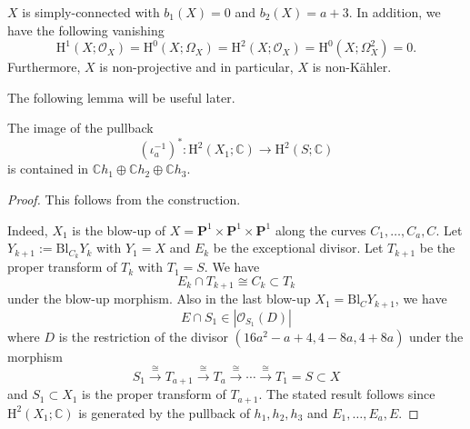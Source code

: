 \begin{proposition}
\(X\) is simply-connected with \(b_{1}(X)=0\) and \(b_{2}(X)=a+3\). In addition, we have
the following vanishing
\begin{equation}
\mathrm{H}^{1}(X;\mathcal{O}_{X})=\mathrm{H}^{0}(X;\Omega_{X})
=\mathrm{H}^{2}(X;\mathcal{O}_{X})
=\mathrm{H}^{0}(X;\Omega_{X}^{2})=0.
\end{equation}
Furthermore, \(X\) is non-projective and in particular, \(X\) is non-K\"{a}hler.
\end{proposition}

The following lemma will be useful later.

\begin{lemma}
\label{lem:image-picard}
The image of the pullback
\begin{equation}
(\iota_{a}^{-1})^{\ast}\colon \mathrm{H}^{2}(X_{1};\mathbb{C})\to \mathrm{H}^{2}(S;\mathbb{C})
\end{equation}
is contained in \(\mathbb{C}h_{1}\oplus\mathbb{C}h_{2}
\oplus\mathbb{C}h_{3}\).
\end{lemma}
\begin{proof}
This follows from the construction.

Indeed, \(X_{1}\) is the blow-up of \(X=\mathbf{P}^{1}\times\mathbf{P}^{1}\times\mathbf{P}^{1}\)
along the curves \(C_{1},\ldots,C_{a},C\). Let 
\(Y_{k+1}:=\mathrm{Bl}_{C_{k}} Y_{k}\) with \(Y_{1}=X\)
and \(E_{k}\) be the exceptional divisor. Let 
\(T_{k+1}\) be the proper transform of \(T_{k}\) with \(T_{1}=S\).
We have
\begin{equation}
E_{k}\cap T_{k+1} \cong C_{k}\subset T_{k}
\end{equation}
under the blow-up morphism. Also in the last blow-up \(X_{1}=\mathrm{Bl}_{C}Y_{k+1}\),
we have
\begin{equation}
E\cap S_{1} \in |\mathcal{O}_{S_{1}}(D)|
\end{equation}
where \(D\) is the restriction of the divisor 
\((16a^{2}-a+4,4-8a,4+8a)\) under the morphism
\begin{equation}
S_{1}\xrightarrow{\cong}T_{a+1}\xrightarrow{\cong} T_{a}
\xrightarrow{\cong}\cdots \xrightarrow{\cong} T_{1}=S\subset X
\end{equation}
and \(S_{1}\subset X_{1}\) is the proper transform of \(T_{a+1}\).
The stated result follows since \(\mathrm{H}^{2}(X_{1};\mathbb{C})\)
is generated by the pullback of \(h_{1},h_{2},h_{3}\) and \(E_{1},\ldots,E_{a},E\).
\end{proof}


